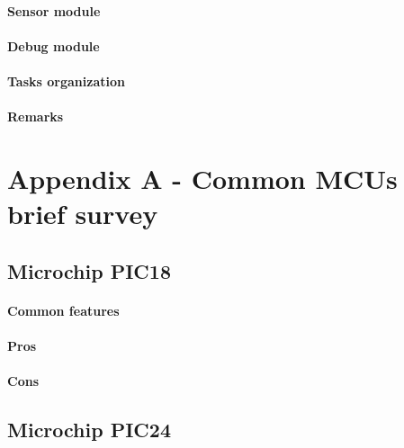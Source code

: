 \documentclass[a4paper,10pt]{article}
\begin{document}
\begin{multicols}{2}
\paragraph{Sensor module}
\TODO


\paragraph{Debug module}
\TODO


\paragraph{Tasks organization}
\TODO


\paragraph{Remarks}
\TODO


\section{Appendix A - Common MCUs brief survey}

\TODO


\subsection{Microchip PIC18}

\TODO


\paragraph{Common features}
\TODO


\paragraph{Pros}
\TODO


\paragraph{Cons}
\TODO


\subsection{Microchip PIC24}


\end{multicols}
\end{document}
